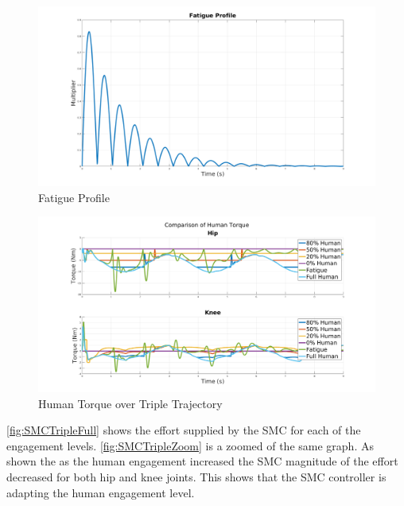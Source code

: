 \begin{figure}
    \centering
    \includegraphics[width=\columnwidth]{images/controllers/gait/fat_profile.png}
    \caption[Fatigue Profile]{Fatigue Profile}
    \label{fig:fatprofile}
\end{figure}


\begin{figure}
    \centering
    \includegraphics[width=\columnwidth]{images/controllers/trajs/human.png}
    \caption[Human Torque over Triple Trajectory]{Human Torque over Triple Trajectory}
    \label{fig:humantripletraj}
\end{figure}


\autoref{fig:SMCTripleFull} shows the effort supplied by the SMC for each of the engagement levels. \autoref{fig:SMCTripleZoom} is a zoomed of the same graph. As shown the as the human engagement increased the SMC magnitude of the effort decreased for both hip and knee joints. This shows that the SMC controller is adapting the human engagement level. 


